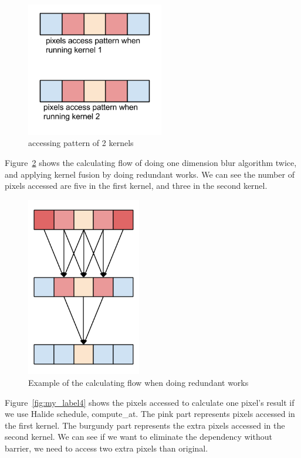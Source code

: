 \documentclass{sigplanconf}
\begin{document}
\begin{figure}[hbtp]
\centering
\includegraphics[width=6cm]{img/figure2.png}
\caption{accessing pattern of 2 kernels}
\label{fig:my_label2}
\end{figure}

    Figure~\ref{fig:my_label3} shows the calculating flow of doing one dimension blur algorithm twice, and applying kernel fusion by doing redundant works. We can see the number of pixels accessed are five in the first kernel, and three in the second kernel.
	
\begin{figure}[hbtp]
\centering
\includegraphics[width=5cm]{img/figure3-6(for-paper).png}
\caption{Example of the calculating flow when doing redundant works}
\label{fig:my_label3}
\end{figure}
	
	Figure~\ref{fig:my_label4} shows the pixels accessed to calculate one pixel’s result if we use Halide schedule, compute\_at. The pink part represents pixels accessed in the first kernel. The burgundy part represents the extra pixels accessed in the second kernel. We can see if we want to eliminate the dependency without barrier, we need to access two extra pixels than original.
	
\end{document}

